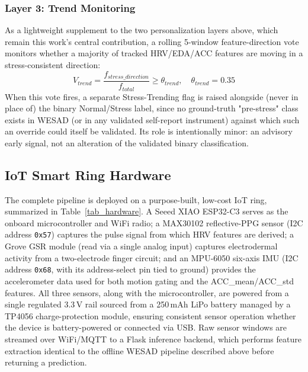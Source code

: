 \documentclass[conference]{IEEEtran}
\begin{document}
\subsubsection{Layer 3: Trend Monitoring}
\label{sec_trend}
As a lightweight supplement to the two personalization layers
above, which remain this work's central contribution, a
rolling 5-window feature-direction vote monitors whether a
majority of tracked HRV/EDA/ACC features are moving in a
stress-consistent direction:
\begin{equation}
V_{trend} = \frac{f_{stress\_direction}}
{f_{total}} \geq \theta_{trend},
\quad \theta_{trend} = 0.35
\label{eq_trend}
\end{equation}
When this vote fires, a separate Stress-Trending flag is
raised alongside (never in place of) the binary
Normal/Stress label, since no ground-truth "pre-stress" class
exists in WESAD (or in any validated self-report instrument)
against which such an override could itself be validated. Its
role is intentionally minor: an advisory early signal, not an
alteration of the validated binary classification.

\subsection{IoT Smart Ring Hardware}
\label{sec_hardware}
The complete pipeline is deployed on a purpose-built,
low-cost IoT ring, summarized in
Table~\ref{tab_hardware}. A Seeed XIAO ESP32-C3 serves as the
onboard microcontroller and WiFi radio; a MAX30102
reflective-PPG sensor (I2C address \texttt{0x57}) captures the
pulse signal from which HRV features are derived; a Grove GSR
module (read via a single analog input) captures electrodermal
activity from a two-electrode finger circuit; and an MPU-6050
six-axis IMU (I2C address \texttt{0x68}, with its address-select
pin tied to ground) provides the accelerometer data used for
both motion gating and the ACC\_mean/ACC\_std features. All
three sensors, along with the microcontroller, are powered from
a single regulated 3.3\,V rail sourced from a 250\,mAh LiPo
battery managed by a TP4056 charge-protection module, ensuring
consistent sensor operation whether the device is
battery-powered or connected via USB. Raw sensor windows are
streamed over WiFi/MQTT to a Flask inference backend, which
performs feature extraction identical to the offline WESAD
pipeline described above before returning a prediction.
\end{document}
